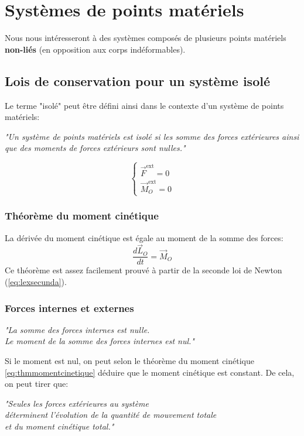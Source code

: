 \documentclass{article}
\numberwithin{equation}{section}
\begin{document}
\section{Systèmes de points matériels}
Nous nous intéresseront à des systèmes composés de plusieurs points matériels \textbf{non-liés} (en opposition aux corps indéformables). %

\subsection{Lois de conservation pour un système isolé}
Le terme "isolé" peut être défini ainsi dans le contexte d'un système de points matériels:
\begin{center}
	\emph{"Un système de points matériels est isolé si les somme des forces extérieures ainsi que des moments de forces extérieurs sont nulles."}
\end{center}
\begin{equation*}
	\boxed{ \begin{cases} 
		\vec F^{\text{ext}} = 0 \\
		\vec M_O^{\text{ext}} = 0
	\end{cases} }
\end{equation*}

\subsubsection{Théorème du moment cinétique}
La dérivée du moment cinétique est égale au moment de la somme des forces:
\begin{equation} \label{eq:thmmomentcinetique}
	\boxed{ \frac{d \vec L_O }{dt} = \vec M_O }
\end{equation}
Ce théorème est assez facilement prouvé à partir de la seconde loi de Newton (\ref{eq:lexsecunda}).

\subsubsection{Forces internes et externes}
\begin{center}
	\emph{"La somme des forces internes est nulle. \\ Le moment de la somme des forces internes est nul."}
\end{center}
Si le moment est nul, on peut selon le théorème du moment cinétique \ref{eq:thmmomentcinetique} déduire que le moment cinétique est constant.
De cela, on peut tirer que:
\begin{center}
	\emph{"Seules les forces extérieures au système \\ déterminent l'évolution de la quantité de mouvement totale \\ et du moment cinétique total."}
\end{center}
\end{document}
